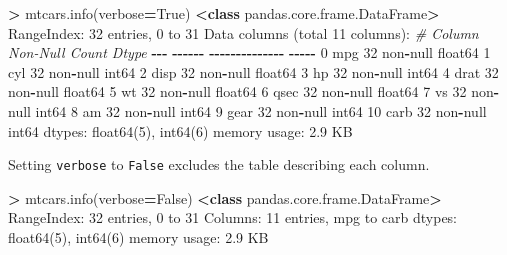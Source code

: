 \documentclass[
]{book}
\newenvironment{Shaded}{\begin{snugshade}}{\end{snugshade}}
\newcommand{\CommentTok}[1]{\textcolor[rgb]{0.56,0.35,0.01}{\textit{#1}}}
\newcommand{\DecValTok}[1]{\textcolor[rgb]{0.00,0.00,0.81}{#1}}
\newcommand{\FloatTok}[1]{\textcolor[rgb]{0.00,0.00,0.81}{#1}}
\newcommand{\KeywordTok}[1]{\textcolor[rgb]{0.13,0.29,0.53}{\textbf{#1}}}
\newcommand{\NormalTok}[1]{#1}
\newcommand{\OperatorTok}[1]{\textcolor[rgb]{0.81,0.36,0.00}{\textbf{#1}}}
\newcommand{\StringTok}[1]{\textcolor[rgb]{0.31,0.60,0.02}{#1}}
\newcommand{\VariableTok}[1]{\textcolor[rgb]{0.00,0.00,0.00}{#1}}
\begin{document}
\begin{Shaded}
\begin{Highlighting}[]
\OperatorTok{\textgreater{}}\NormalTok{ mtcars.info(verbose}\OperatorTok{=}\VariableTok{True}\NormalTok{)}
\OperatorTok{\textless{}}\KeywordTok{class} \StringTok{\textquotesingle{}pandas.core.frame.DataFrame\textquotesingle{}}\OperatorTok{\textgreater{}}
\NormalTok{RangeIndex: }\DecValTok{32}\NormalTok{ entries, }\DecValTok{0}\NormalTok{ to }\DecValTok{31}
\NormalTok{Data columns (total }\DecValTok{11}\NormalTok{ columns):}
 \CommentTok{\#   Column  Non{-}Null Count  Dtype  }
\OperatorTok{{-}{-}{-}}  \OperatorTok{{-}{-}{-}{-}{-}{-}}  \OperatorTok{{-}{-}{-}{-}{-}{-}{-}{-}{-}{-}{-}{-}{-}{-}}  \OperatorTok{{-}{-}{-}{-}{-}}  
 \DecValTok{0}\NormalTok{   mpg     }\DecValTok{32}\NormalTok{ non}\OperatorTok{{-}}\NormalTok{null     float64}
 \DecValTok{1}\NormalTok{   cyl     }\DecValTok{32}\NormalTok{ non}\OperatorTok{{-}}\NormalTok{null     int64  }
 \DecValTok{2}\NormalTok{   disp    }\DecValTok{32}\NormalTok{ non}\OperatorTok{{-}}\NormalTok{null     float64}
 \DecValTok{3}\NormalTok{   hp      }\DecValTok{32}\NormalTok{ non}\OperatorTok{{-}}\NormalTok{null     int64  }
 \DecValTok{4}\NormalTok{   drat    }\DecValTok{32}\NormalTok{ non}\OperatorTok{{-}}\NormalTok{null     float64}
 \DecValTok{5}\NormalTok{   wt      }\DecValTok{32}\NormalTok{ non}\OperatorTok{{-}}\NormalTok{null     float64}
 \DecValTok{6}\NormalTok{   qsec    }\DecValTok{32}\NormalTok{ non}\OperatorTok{{-}}\NormalTok{null     float64}
 \DecValTok{7}\NormalTok{   vs      }\DecValTok{32}\NormalTok{ non}\OperatorTok{{-}}\NormalTok{null     int64  }
 \DecValTok{8}\NormalTok{   am      }\DecValTok{32}\NormalTok{ non}\OperatorTok{{-}}\NormalTok{null     int64  }
 \DecValTok{9}\NormalTok{   gear    }\DecValTok{32}\NormalTok{ non}\OperatorTok{{-}}\NormalTok{null     int64  }
 \DecValTok{10}\NormalTok{  carb    }\DecValTok{32}\NormalTok{ non}\OperatorTok{{-}}\NormalTok{null     int64  }
\NormalTok{dtypes: float64(}\DecValTok{5}\NormalTok{), int64(}\DecValTok{6}\NormalTok{)}
\NormalTok{memory usage: }\FloatTok{2.9}\NormalTok{ KB}
\end{Highlighting}
\end{Shaded}

Setting \texttt{verbose} to \texttt{False} excludes the table describing each column.

\begin{Shaded}
\begin{Highlighting}[]
\OperatorTok{\textgreater{}}\NormalTok{ mtcars.info(verbose}\OperatorTok{=}\VariableTok{False}\NormalTok{)}
\OperatorTok{\textless{}}\KeywordTok{class} \StringTok{\textquotesingle{}pandas.core.frame.DataFrame\textquotesingle{}}\OperatorTok{\textgreater{}}
\NormalTok{RangeIndex: }\DecValTok{32}\NormalTok{ entries, }\DecValTok{0}\NormalTok{ to }\DecValTok{31}
\NormalTok{Columns: }\DecValTok{11}\NormalTok{ entries, mpg to carb}
\NormalTok{dtypes: float64(}\DecValTok{5}\NormalTok{), int64(}\DecValTok{6}\NormalTok{)}
\NormalTok{memory usage: }\FloatTok{2.9}\NormalTok{ KB}
\end{Highlighting}
\end{Shaded}
\end{document}
